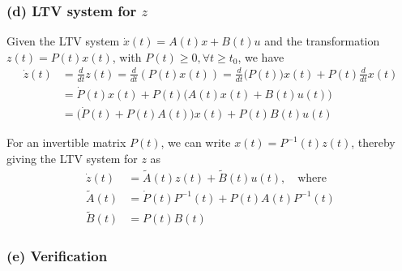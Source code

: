 \subsubsection*{(d) LTV system for \( z \)}

Given the LTV system \( \dot{x}(t)=A(t) x+B(t) u \) and the transformation \( z(t)=P(t) x(t) \), with \( P(t) \geq 0, \forall t \geq t_{0} \), we have
\begin{align*}
    \dot{z}(t)
     & =
    \frac{d}{dt} z(t)
    =
    \frac{d}{dt} (P(t) x(t))
    =
    \frac{d}{dt} \Big(P(t)\Big) x(t) + P(t) \frac{d}{dt} x(t)
    \\
     & =
    \dot{P}(t) x(t) + P(t) \Big( A(t) x(t) + B(t) u(t) \Big)
    \\ & =
    \Big( \dot{P}(t) + P(t) A(t) \Big) x(t) + P(t) B(t) u(t)
\end{align*}

For an invertible matrix \( P(t) \), we can write \( x(t) = P^{-1}(t) z(t) \), thereby giving the LTV system for \( z \) as
\[
    \boxed{
        \begin{aligned}
            \dot{z}(t)
             & =
            \tilde{A}(t) z(t) + \tilde{B}(t) u(t), \quad \text{where}
            \\
            \tilde{A}(t)
             & =
            \dot{P}(t) P^{-1}(t) + P(t) A(t) P^{-1}(t)
            \\
            \tilde{B}(t)
             & =
            P(t) B(t)
        \end{aligned}
    }
\]

\subsubsection*{(e) Verification}


